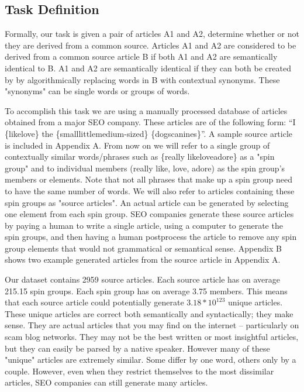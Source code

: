 \documentclass[11pt,letterpaper,oneside, titlepage]{scrartcl}
\begin{document}
\subsection{Task Definition}

Formally, our task is given a pair of articles A1 and A2, determine whether or not they are derived from a common source. Articles A1 and A2 are considered to be derived from a common source article B if both A1 and A2 are semantically identical to B. A1 and A2 are semantically identical if they can both be created by by algorithmically replacing words in B with contextual synonyms. These "synonyms" can be single words or groups of words. 

To accomplish this task we are using a manually processed database of articles obtained from a major SEO company. These articles are of the following form: ``I \{like\textbar love\} the \{small\textbar little\textbar medium-sized\} \{dogs\textbar canines\}''. A sample source article is included in Appendix A. From now on we will refer to a single group of contextually similar words/phrases such as \{really like\textbar love\textbar adore\} as a "spin group" and to individual members (really like, love, adore) as the spin group's members or elements. Note that not all phrases that make up a spin group need to have the same number of words. We will also refer to articles containing these spin groups as "source articles". An actual article can be generated by selecting one element from each spin group. SEO companies generate these source articles by paying a human to write a single article, using a computer to generate the spin groups, and then having a human postprocess the article to remove any spin group elements that would not grammatical or semantical sense. Appendix B shows two example generated articles from the source article in Appendix A.

Our dataset contains 2959 source articles. Each source article has on average 215.15 spin groups. Each spin group has on average 3.75 members. This means that each source article could potentially generate $3.18*10^{123}$ unique articles. These unique articles are correct both semantically and syntactically; they make sense. They are actual articles that you may find on the internet -- particularly on scam blog networks. They may not be the best written or most insightful articles, but they can easily be parsed by a native speaker.  However many of these "unique" articles are extremely similar. Some differ by one word, others only by a couple. However, even when they restrict themselves to the most dissimilar articles, SEO companies can still generate many articles.
\end{document}
